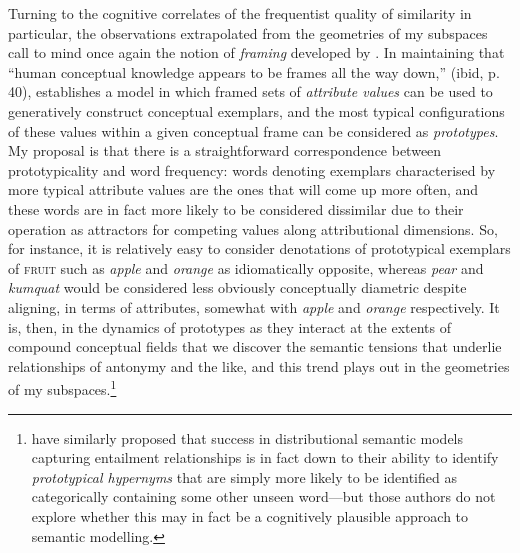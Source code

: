 Turning to the cognitive correlates of the frequentist quality of similarity in particular, the observations extrapolated from the geometries of my subspaces call to mind once again the notion of \emph{framing} developed by \cite{Barsalou1992}.  In maintaining that ``human conceptual knowledge appears to be frames all the way down,'' (ibid, p. 40), \citeauthor{Barsalou1992} establishes a model in which framed sets of \emph{attribute values} can be used to generatively construct conceptual exemplars, and the most typical configurations of these values within a given conceptual frame can be considered as \emph{prototypes}.  My proposal is that there is a straightforward correspondence between prototypicality and word frequency: words denoting exemplars characterised by more typical attribute values are the ones that will come up more often, and these words are in fact more likely to be considered dissimilar due to their operation as attractors for competing values along attributional dimensions.  So, for instance, it is relatively easy to consider denotations of prototypical exemplars of \textsc{fruit} such as \emph{apple} and \emph{orange} as idiomatically opposite, whereas \emph{pear} and \emph{kumquat} would be considered less obviously conceptually diametric despite aligning, in terms of attributes, somewhat with \emph{apple} and \emph{orange} respectively.  It is, then, in the dynamics of prototypes as they interact at the extents of compound conceptual fields that we discover the semantic tensions that underlie relationships of antonymy and the like, and this trend plays out in the geometries of my subspaces.\footnote{\cite{LevyEA2015} have similarly proposed that success in distributional semantic models capturing entailment relationships is in fact down to their ability to identify \emph{prototypical hypernyms} that are simply more likely to be identified as categorically containing some other unseen word---but those authors do not explore whether this may in fact be a cognitively plausible approach to semantic modelling.}


